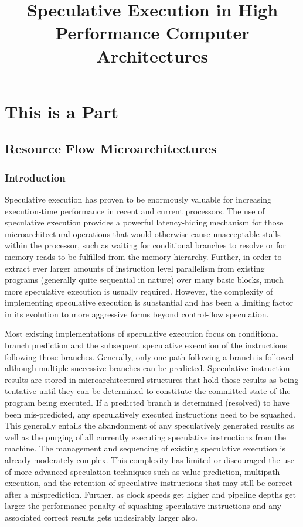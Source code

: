 \documentclass{book}
\begin{document}
\tableofcontents
\listoftables
\listoffigures
\part{This is a Part}
%
\title{Speculative Execution in High Performance Computer Architectures}
%
%
%
%
%
\chapter{Resource Flow Microarchitectures}
%
%
%
%
\section{Introduction}
%
Speculative execution has proven to be enormously valuable for
increasing execution-time performance in recent and current
processors.  The use of speculative execution provides a powerful
latency-hiding mechanism for those microarchitectural operations that
would otherwise cause unacceptable stalls within the processor, such as
waiting for conditional branches to resolve or for memory reads to be
fulfilled from the memory hierarchy.  
Further, in order to extract ever larger amounts of instruction
level parallelism from existing programs (generally quite sequential
in nature) over many basic blocks, much more speculative 
execution is usually required.
However, the complexity of
implementing speculative execution is substantial and has been a
limiting factor in its evolution to more aggressive forms beyond
control-flow speculation.

Most existing implementations of speculative execution focus on
conditional branch prediction and the subsequent speculative execution
of the instructions following those branches.  Generally, only one path
following a branch is followed although multiple successive branches
can be predicted.  Speculative instruction results are stored in
microarchitectural structures that hold those results as being
tentative until they can be determined to constitute the committed
state of the program being executed.  If a predicted branch is
determined (resolved) to have been mis-predicted, any speculatively
executed instructions need to be squashed.  This generally entails the
abandonment of any speculatively generated results as well as the
purging of all currently executing speculative instructions from the
machine.  The management and sequencing of existing speculative
execution is already moderately complex.  This complexity has
limited or discouraged the use of more advanced speculation techniques
such as value prediction, multipath execution, and the retention of
speculative instructions that may still be correct after a
misprediction.  Further, as clock speeds get higher and pipeline depths
get larger the performance penalty of squashing speculative
instructions and any associated correct results gets undesirably larger
also.
\end{document}
